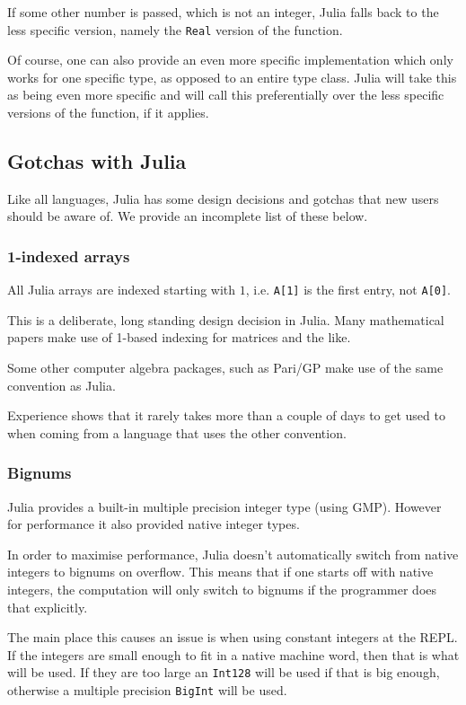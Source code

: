 \documentclass[a4paper,10pt]{article}
\newcommand{\code}{\lstinline}
\begin{document}
If some other number is passed, which is not an integer, Julia falls back to the less specific version,
namely the \code{Real} version of the function.

Of course, one can also provide an even more specific implementation which only works for one specific
type, as opposed to an entire type class. Julia will take this as being even more specific and will call
this preferentially over the less specific versions of the function, if it applies.

\subsection{Gotchas with Julia}

Like all languages, Julia has some design decisions and gotchas that new users should be aware of. We
provide an incomplete list of these below.

\subsubsection{1-indexed arrays}

All Julia arrays are indexed starting with $1$, i.e. \code{A[1]} is the first entry, not \code{A[0]}.

This is a deliberate, long standing design decision in Julia. Many mathematical papers make use of
1-based indexing for matrices and the like. 

Some other computer algebra packages, such as Pari/GP make use of the same convention as Julia. 

Experience shows that it rarely takes more than a couple of days to get used to when coming from a
language that uses the other convention.

\subsubsection{Bignums}

Julia provides a built-in multiple precision integer type (using GMP). However for performance it also
provided native integer types.

In order to maximise performance, Julia doesn't automatically switch from native integers to bignums on
overflow. This means that if one starts off with native integers, the computation will only switch to
bignums if the programmer does that explicitly.

The main place this causes an issue is when using constant integers at the REPL. If the integers are
small enough to fit in a native machine word, then that is what will be used. If they are too large
an \code{Int128} will be used if that is big enough, otherwise a multiple precision \code{BigInt}
will be used. 
\end{document}
